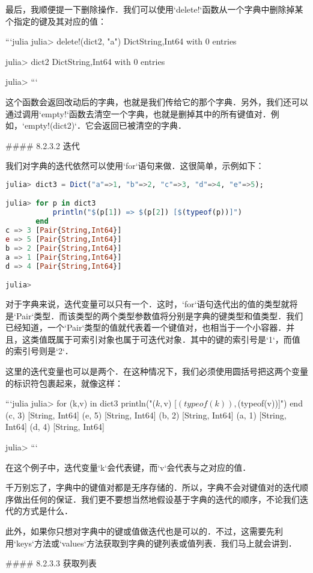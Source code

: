 最后，我顺便提一下删除操作．我们可以使用`delete!`函数从一个字典中删除掉某个指定的键及其对应的值：

```julia
julia> delete!(dict2, "a")
Dict{String,Int64} with 0 entries

julia> dict2
Dict{String,Int64} with 0 entries

julia> 
```

这个函数会返回改动后的字典，也就是我们传给它的那个字典．另外，我们还可以通过调用`empty!`函数去清空一个字典，也就是删掉其中的所有键值对．例如，`empty!(dict2)`．它会返回已被清空的字典．

#### 8.2.3.2 迭代

我们对字典的迭代依然可以使用`for`语句来做．这很简单，示例如下：
\begin{lstlisting}[language=julia]
julia> dict3 = Dict("a"=>1, "b"=>2, "c"=>3, "d"=>4, "e"=>5);

julia> for p in dict3
           println("$(p[1]) => $(p[2]) [$(typeof(p))]")
       end
c => 3 [Pair{String,Int64}]
e => 5 [Pair{String,Int64}]
b => 2 [Pair{String,Int64}]
a => 1 [Pair{String,Int64}]
d => 4 [Pair{String,Int64}]

julia> 
\end{lstlisting}

对于字典来说，迭代变量可以只有一个．这时，`for`语句迭代出的值的类型就将是`Pair`类型．而该类型的两个类型参数值将分别是字典的键类型和值类型．我们已经知道，一个`Pair`类型的值就代表着一个键值对，也相当于一个小容器．并且，这类值既属于可索引对象也属于可迭代对象．其中的键的索引号是`1`，而值的索引号则是`2`．

这里的迭代变量也可以是两个．在这种情况下，我们必须使用圆括号把这两个变量的标识符包裹起来，就像这样：

```julia
julia> for (k,v) in dict3
           println("($k, $v) [$(typeof(k)), $(typeof(v))]")
       end
(c, 3) [String, Int64]
(e, 5) [String, Int64]
(b, 2) [String, Int64]
(a, 1) [String, Int64]
(d, 4) [String, Int64]

julia> 
```

在这个例子中，迭代变量`k`会代表键，而`v`会代表与之对应的值．

千万别忘了，字典中的键值对都是无序存储的．所以，字典不会对键值对的迭代顺序做出任何的保证．我们更不要想当然地假设基于字典的迭代的顺序，不论我们迭代的方式是什么．

此外，如果你只想对字典中的键或值做迭代也是可以的．不过，这需要先利用`keys`方法或`values`方法获取到字典的键列表或值列表．我们马上就会讲到．

#### 8.2.3.3 获取列表

